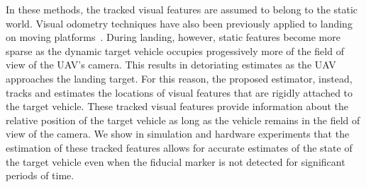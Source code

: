 
In these methods, the tracked visual features are assumed to belong to the
static world.
Visual odometry techniques
have also been previously applied to landing on
moving platforms~\cite{falanga2017vision}.
During landing, however, static features become more sparse as the dynamic target vehicle
occupies progessively more of the
field of view of the UAV's camera. This results in detoriating
estimates as the UAV approaches the landing target.
For this reason, the proposed estimator, instead, tracks and estimates the
locations of
visual features that are rigidly attached to the target vehicle. These tracked
visual features provide information about the relative position of the target
vehicle
as long as the vehicle remains in the field of view of the camera.
We show in simulation and hardware experiments that the estimation of these tracked features allows
for accurate estimates of the state of the target vehicle even
when the fiducial marker is not detected for significant periods of time.

